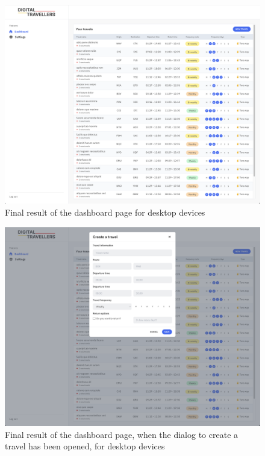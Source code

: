 \documentclass[./memory.tex]{subfiles}
\begin{document}
\begin{figure}[H]
	\centering
	\includegraphics[width=\textwidth]{./assets/results/desktop-dashboard.png}
	\caption{Final result of the dashboard page for desktop devices}
\end{figure}
\begin{figure}[H]
	\centering
	\includegraphics[width=\textwidth]{./assets/results/desktop-create.png}
	\caption{Final result of the dashboard page, when the dialog to create a
		travel has been opened, for desktop devices}
\end{figure}
\end{document}
